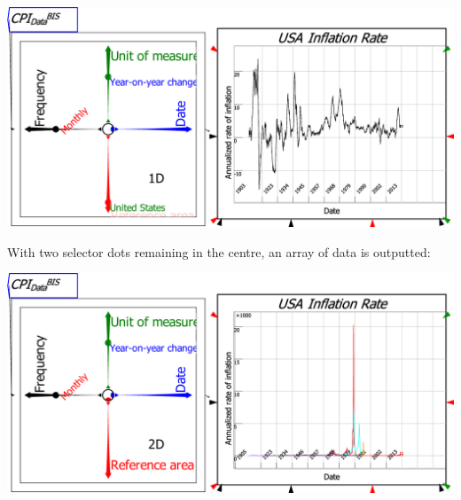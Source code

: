 \includegraphics[width=15cm]{images/RavelDataSeriesSelected}

With two selector dots remaining in the centre, an array of data is
outputted:

\includegraphics[width=15cm]{images/RavelData2SeriesSelected}

